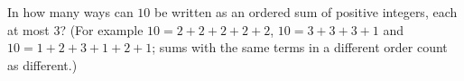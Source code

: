 In how many ways can $10$ be written as an ordered sum of positive integers, each at most $3$? (For example $10=2+2+2+2+2$, $10=3+3+3+1$ and $10=1+2+3+1+2+1$; sums with the same terms in a different order count as different.)
